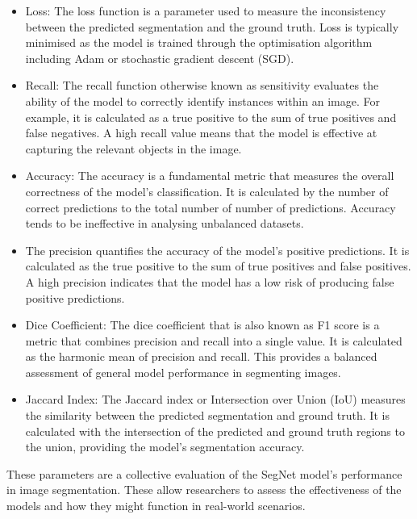 \begin{itemize}
    \item Loss: The loss function is a parameter used to measure the inconsistency between the predicted segmentation and the ground truth. Loss is typically minimised as the model is trained through the optimisation algorithm including Adam or stochastic gradient descent (SGD).

    \item Recall: The recall function otherwise known as sensitivity evaluates the ability of the model to correctly identify instances within an image. For example, it is calculated as a true positive to the sum of true positives and false negatives. A high recall value means that the model is effective at capturing the relevant objects in the image.

    \item Accuracy: The accuracy is a fundamental metric that measures the overall correctness of the model's classification. It is calculated by the number of correct predictions to the total number of number of predictions. Accuracy tends to be ineffective in analysing unbalanced datasets.

    \item The precision quantifies the accuracy of the model's positive predictions. It is calculated as the true positive to the sum of true positives and false positives. A high precision indicates that the model has a low risk of producing false positive predictions.

    \item Dice Coefficient: The dice coefficient that is also known as F1 score is a metric that combines precision and recall into a single value. It is calculated as the harmonic mean of precision and recall. This provides a balanced assessment of general model performance in segmenting images.

    \item Jaccard Index: The Jaccard index or Intersection over Union (IoU) measures the similarity between the predicted segmentation and ground truth. It is calculated with the intersection of the predicted and ground truth regions to the union, providing the model's segmentation accuracy.
\end{itemize}

These parameters are a collective evaluation of the SegNet model's performance in image segmentation. These allow researchers to assess the effectiveness of the models and how they might function in real-world scenarios.

